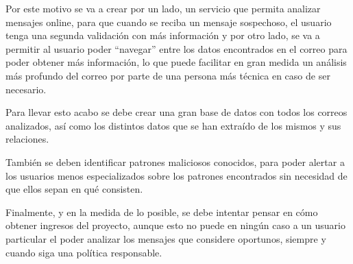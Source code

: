 Por este motivo se va a crear por un lado, un servicio que permita analizar mensajes online, para que cuando se reciba un mensaje sospechoso, el usuario tenga una segunda validación con más información y por otro lado, se va a permitir al usuario poder “navegar” entre los datos encontrados en el correo para poder obtener más información, lo que puede facilitar en gran medida un análisis más profundo del correo por parte de una persona más técnica en caso de ser necesario.

Para llevar esto acabo se debe crear una gran base de datos con todos los correos analizados, así como los distintos datos que se han extraído de los mismos y sus relaciones. 

También se deben identificar patrones maliciosos conocidos, para poder alertar a los usuarios menos especializados sobre los patrones encontrados sin necesidad de que ellos sepan en qué consisten.

Finalmente, y en la medida de lo posible, se debe intentar pensar en cómo obtener ingresos del proyecto, aunque esto no puede en ningún caso a un usuario particular el poder analizar los mensajes que considere oportunos, siempre y cuando siga una política responsable. 
